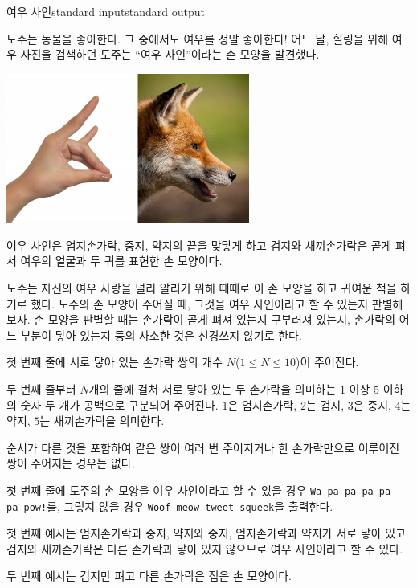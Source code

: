 \begin{problem}{여우 사인}{standard input}{standard output}

도주는 동물을 좋아한다. 그 중에서도 여우를 정말 좋아한다! 어느 날, 힐링을 위해 여우 사진을 검색하던 도주는 ``여우 사인''이라는 손 모양을 발견했다.

\begin{center}
  \includegraphics[width=0.6\textwidth]{fox-sign.png}
\end{center}

여우 사인은 엄지손가락, 중지, 약지의 끝을 맞닿게 하고 검지와 새끼손가락은 곧게 펴서 여우의 얼굴과 두 귀를 표현한 손 모양이다.

도주는 자신의 여우 사랑을 널리 알리기 위해 때때로 이 손 모양을 하고 귀여운 척을 하기로 했다. 도주의 손 모양이 주어질 때, 그것을 여우 사인이라고 할 수 있는지 판별해 보자. 손 모양을 판별할 때는 손가락이 곧게 펴져 있는지 구부러져 있는지, 손가락의 어느 부분이 닿아 있는지 등의 사소한 것은 신경쓰지 않기로 한다.

\InputFile
첫 번째 줄에 서로 닿아 있는 손가락 쌍의 개수 $N$($1 \le N \le 10$)이 주어진다.

두 번째 줄부터 $N$개의 줄에 걸쳐 서로 닿아 있는 두 손가락을 의미하는 $1$ 이상 $5$ 이하의 숫자 두 개가 공백으로 구분되어 주어진다. $1$은 엄지손가락, $2$는 검지, $3$은 중지, $4$는 약지, $5$는 새끼손가락을 의미한다.

순서가 다른 것을 포함하여 같은 쌍이 여러 번 주어지거나 한 손가락만으로 이루어진 쌍이 주어지는 경우는 없다.

\OutputFile
첫 번째 줄에 도주의 손 모양을 여우 사인이라고 할 수 있을 경우 \texttt{Wa-pa-pa-pa-pa-pa-pow!}를, 그렇지 않을 경우 \texttt{Woof-meow-tweet-squeek}을 출력한다.

\Example

\begin{example}
%
%
\end{example}

\Notes
첫 번째 예시는 엄지손가락과 중지, 약지와 중지, 엄지손가락과 약지가 서로 닿아 있고 검지와 새끼손가락은 다른 손가락과 닿아 있지 않으므로 여우 사인이라고 할 수 있다.

두 번째 예시는 검지만 펴고 다른 손가락은 접은 손 모양이다.

\end{problem}
